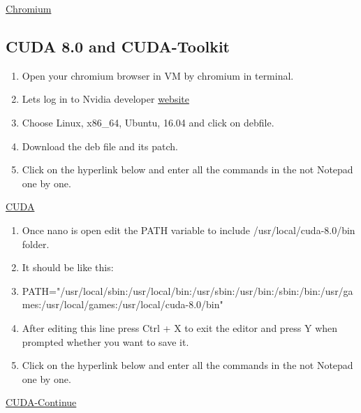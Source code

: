\documentclass[12pt]{article}
\begin{document}
\begin{center}
\href{run:./Text_Files_16/Chrome.txt}{\Large Chromium}
\end{center}

\subsection{CUDA 8.0 and CUDA-Toolkit}
\begin{enumerate}[resume]
  \item Open your chromium browser in VM by chromium in terminal.
  \item Lets log in to Nvidia developer  \href{https://developer.nvidia.com/cuda-downloads}{website}
  \item Choose Linux, x86\_64, Ubuntu, 16.04 and click on debfile.
  \item Download the deb file and its patch.
  \item Click on the hyperlink below and enter all the commands in the not Notepad one by one.
\end{enumerate}

\begin{center}
\href{run:./Text_Files_16/Cuda.txt}{\Large CUDA}
\end{center}

\begin{enumerate}[resume]
  \item Once nano is open edit the PATH variable to include /usr/local/cuda-8.0/bin folder.
  \item It should be like this:
  \item  {\scriptsize PATH="/usr/local/sbin:/usr/local/bin:/usr/sbin:/usr/bin:/sbin:/bin:/usr/games:/usr/local/games:/usr/local/cuda-8.0/bin"}
  \item After editing this line press Ctrl + X to exit the editor and press Y when prompted whether you want to save it.
  \item Click on the hyperlink below and enter all the commands in the not Notepad one by one.
\end{enumerate}

\begin{center}
\href{run:./Text_Files_16/Cuda1.txt}{\Large CUDA-Continue}
\end{center}


%
%
\end{document}

